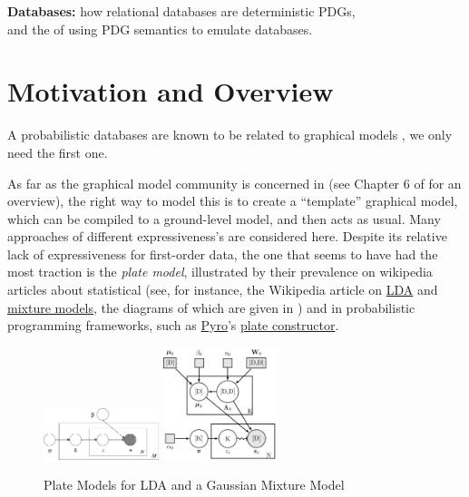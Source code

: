 \documentclass{article}
\theoremstyle{definition}
\theoremstyle{remark}
\begin{document}
\begin{center}
  \textbf{ \Large Databases:} how relational databases are deterministic PDGs,\\
  and the of using PDG semantics to emulate databases.
\end{center}

\section{Motivation and Overview}

A probabilistic databases are known to be related to graphical models \cite{suciu2011probabilistic}, we only need the first one.

As far as the graphical model community is concerned in (see Chapter 6 of \cite{KF09} for an overview), the right way to model this is to create a ``template'' graphical model, which can be compiled to a ground-level model, and then acts as usual. Many approaches of different expressiveness's are considered here. Despite its relative lack of expressiveness for first-order data, the one that seems to have had the most traction is the \emph{plate model}, illustrated by their prevalence on wikipedia articles about statistical (see, for instance, the Wikipedia article on \href{https://en.wikipedia.org/wiki/Latent_Dirichlet_allocation}{LDA} and \href{https://en.wikipedia.org/wiki/Mixture_model}{mixture models}, the diagrams of which are given in )
and in probabilistic programming frameworks, such as \href{https://pyro.ai/}{Pyro}'s \href{http://docs.pyro.ai/en/0.3.0-release/primitives.html#pyro.plate}{plate constructor}.

\begin{figure}[H]
	\centering
	\hfill%
	\includegraphics[width=0.3\textwidth]{img/lda.png}%
	\hfill%
	\includegraphics[width=0.3\textwidth]{img/gaussian-mixture-switch.png}%
	\hfill~\\
	\caption{Plate Models for LDA and a Gaussian Mixture Model}\label{fig:platemodel-ex}
\end{figure}
\end{document}

